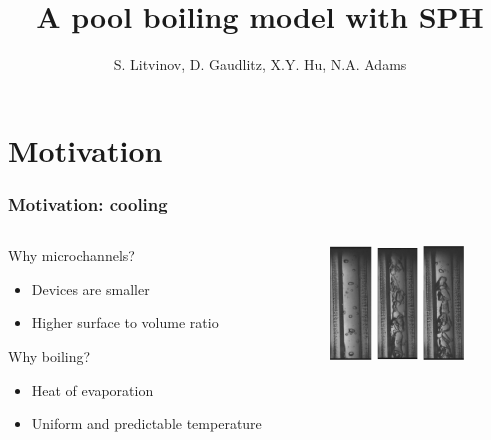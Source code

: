\documentclass{beamer}
\title{A pool boiling model with SPH}
\date{}
\author{S. Litvinov, D. Gaudlitz, X.Y. Hu, N.A. Adams}
\institute{
  Lehrstuhl f\"{u}r Aerodynamik und Str\"{o}mungsmechanik \\
  TU M\"{u}nich
}
\begin{document}
\begin{frame}
  \titlepage
\end{frame}

\begin{frame}
  \tableofcontents
\end{frame}

\section[Motivation]{Motivation}
\begin{frame}
  \frametitle{Motivation: cooling}
  \begin{columns}
    \begin{column}{0.5\textwidth}
      \begin{block}{Why microchannels?}
        \begin{itemize}
        \item Devices are smaller
        \item Higher surface to volume ratio
        \end{itemize}
      \end{block}
      \begin{block}{Why boiling?}
        \begin{itemize}
        \item Heat of evaporation
        \item Uniform and predictable temperature
        \end{itemize}
      \end{block}
    \end{column}
    \begin{column}{0.5\textwidth}
      \begin{figure}
        \centering
        \includegraphics[width=1.1cm]{exp01.png}
        \includegraphics[width=1.1cm]{exp02.png}
        \includegraphics[width=1.1cm]{exp03.png}

\end{figure}
\end{column}
\end{columns}
\end{frame}
\end{document}
